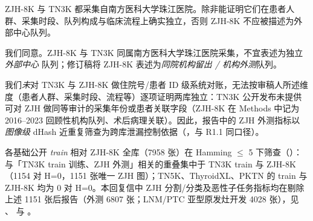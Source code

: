 \begin{reviewercomment}
ZJH-8K 与 TN3K 都采集自南方医科大学珠江医院。除非能证明它们在患者人群、采集时段、队列构成与临床流程上确实独立，否则 ZJH-8K 不应被描述为外部中心队列。
\end{reviewercomment}
\begin{authorresponse}
我们同意。ZJH-8K 与 TN3K 同属南方医科大学珠江医院采集，不宜表述为独立 \emph{外部中心} 队列；修订稿将 ZJH-8K 表述为\emph{同院机构留出 / 机构外测}队列。\par
我们\emph{未}对 TN3K 与 ZJH-8K 做住院号/患者 ID 级系统对账，无法按审稿人所述维度（患者人群、采集时段、流程等）逐项证明两库独立：TN3K 公开发布未提供可对 ZJH 做同等审计的采集年份或患者关联字段（ZJH-8K 在 Methods 中记为 2016--2023 回顾性机构队列、术后病理关联）。因此，报告中的 ZJH 外测指标以 \emph{图像级} dHash 近重复筛查为跨库泄漏控制依据（，与 R1.1 同口径）。\par
各基础公开 \emph{train} 相对 ZJH-8K 全库（7958 张）在 Hamming $\leq$ 5 下筛查（）：与「TN3K train 训练、ZJH 外测」相关的重叠集中于 TN3K train 与 ZJH-8K（1154 对 H=0，1151 张唯一 ZJH 图）；TN5K、ThyroidXL、PKTN 的 train 与 ZJH-8K 均为 0 对 H=0。本回复信中 ZJH 分割/分类及恶性子任务指标均在剔除上述 1151 张后报告（外测 6807 张；LNM/PTC 亚型原发灶开发 4028 张），见 、 与 。\par
\par
\end{authorresponse}

